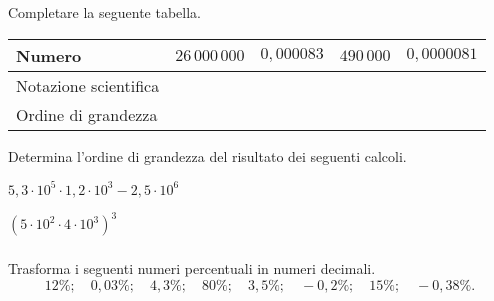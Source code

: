\begin{esercizio}
\label{ese:3.73}
Completare la seguente tabella.\\ [.5em]
\begin{tabular}{|m{}|m{}
                |m{}|m{}
                |m{}|}
\hline
Numero & \(26\,000\,000\) & \(0,000083\) & \(490\,000\) & \(0,0000081\)\\
\hline
Notazione scientifica & & & &\\
\hline
Ordine di grandezza & & & &\\
\hline
\end{tabular}
\end{esercizio}
\vspace{-.5em}

\begin{esercizio}
\label{ese:3.74}
Determina l'ordine di grandezza del risultato dei seguenti calcoli.

\begin{htmulticols}{2}
\begin{enumeratees}
\item \(5,3\cdot10^5\cdot1,2\cdot10^3-2,5\cdot10^6\)
\item \((5\cdot10^2\cdot4\cdot10^3)^3\)
\end{enumeratees}
\end{htmulticols}
\end{esercizio}

\subsubsection*{}

\begin{esercizio}
\label{ese:3.79}
Trasforma i seguenti numeri percentuali in numeri decimali.
\[12\%;\quad0,03\%;\quad4,3\%;\quad80\%;\quad3,5\%;\quad-0,2\%;\quad15\%;
\quad-0,38\%.\]
\end{esercizio}

